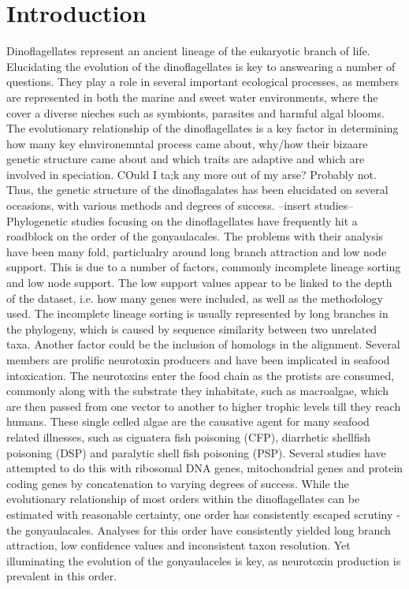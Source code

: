 \documentclass[12pt]{article}
\begin{document}
\section{Introduction}
Dinoflagellates represent an ancient lineage of the eukaryotic branch of life. Elucidating the evolution of the dinoflagellates is key to answearing a number of questions. They play a role in several important ecological processes, as members are represented in both the marine and sweet water environments, where the cover a diverse nieches such as symbionts, parasites and harmful algal blooms.
 The evolutionary relationship of the dinoflagellates is a key factor in determining how many key ehnvironemntal process came about, why/how their bizaare genetic structure came about and which traits are adaptive and which are involved in speciation. COuld I ta;k any more out of my arse? Probably not. 
Thus, the genetic structure of the dinoflagalates has been elucidated on several occasions, with various methods and degrees of success. --insert studies--
Phylogenetic studies focusing on the dinoflagellates have frequently hit a roadblock on the order of the gonyaulacales. The problems with their analysis have been many fold, particlualry around long branch attraction and low node support. This is due to a number of factors, commonly incomplete lineage sorting and low node support. The low support values appear to be linked to the depth of the dataset, i.e. how many genes were included, as well as the methodology used. The incomplete lineage sorting is usually represented by long branches in the phylogeny, which is caused by sequence similarity between two unrelated taxa. Another factor could be the inclusion of homologs in the alignment.
Several members are prolific neurotoxin producers and have been implicated in seafood intoxication. The neurotoxins enter the food chain as the protists are consumed, commonly along with the substrate they inhabitate, such as macroalgae, which are then passed from one vector to another to higher trophic levels till they reach humans. These single celled algae are the causative agent for many seafood related illnesses, such as ciguatera fish poisoning (CFP), diarrhetic shellfish poisoning (DSP) and paralytic shell fish poisoning (PSP).
Several studies have attempted to do this with ribosomal DNA genes, mitochondrial genes and protein coding genes by concatenation to varying degrees of success. While the evolutionary relationship of most orders within the dinoflagellates can be estimated with reasonable certainty, one order has consistently escaped scrutiny - the gonyaulacales. Analyses for this order have consistently yielded long branch attraction, low confidence values and inconsistent taxon resolution. Yet illuminating the evolution of the gonyaulaceles is key, as neurotoxin production is prevalent in this order. 
\end{document}
